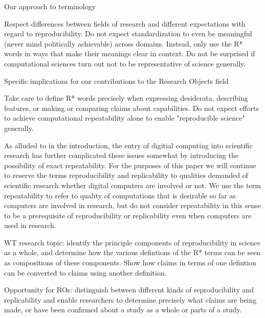 	Our approach to terminology

		Respect differences between fields of research and different expectations with regard to reproducibility.
		Do not expect standardization to even be meaningful (never mind politically achievable) across domains.
		Instead, only use the R* words in ways that make their meanings clear in context.
		Do not be surprised if computational sciences turn out not to be representative of science generally.

	Specific implications for our contributions to the Research Objects field

		Take care to define R* words precisely when expressing desiderata, describing features, or making or comparing claims about capabilities.
		Do not expect efforts to achieve computational repeatability alone to enable "reproducible science" generally.

As alluded to in the introduction, the entry of digitial computing into scientific research
	has further complicated these issues somewhat by introducing the possibility of exact repeatability.
For the purposes of this paper we will continue to reserve the terms reproducibility and replicability to
	qualities demanded of scientific research whether digital computers are involved or not.
We use the term repeatability to refer to quality of computations that is desirable so far as computers are involved
	in research, but do not consider repeatability in this sense to be a prerequisite of reproducibility or
	replicability even when computers are used in research.


WT research topic:  identify the principle components of reproducibility in science as a whole, and determine how the various
defintions of the R* terms can be seen as compositions of these components.  Show how claims in terms of one defintion can be
converted to claims using another definition.


Opportunity for ROs:  distinguish between different kinds of reproducibility and replicability and enable researchers to determine
precisely what claims are being made, or have been confirmed about a study as a whole or parts of a study.


